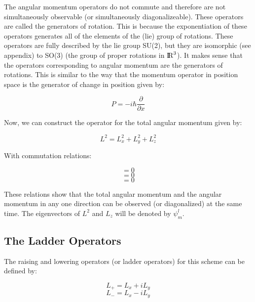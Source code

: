 \documentclass{article}
\begin{document}
The angular momentum operators do not commute and therefore are not simultaneously observable (or simultaneously diagonalizeable). These operators are called the generators of rotation. This is because the exponentiation of these operators generates all of the elements of the (lie) group of rotations. These operators are fully described by the lie group SU(2), but they are isomorphic (see appendix) to SO(3) (the group of proper rotations in ${\rm I\!R}^3$). It makes sense that the operators corresponding to angular momentum are the generators of rotations. This is similar to the way that the momentum operator in position space is the generator of change in position given by:

\begin{equation}
P = -i\hbar\frac{\partial}{\partial x} 
\end{equation}

Now, we can construct the operator for the total angular momentum given by:

\begin{equation}
L^2 = L_{x}^2 + L_{y}^2 + L_{z}^2
\end{equation}

With commutation relations:

\begin{equation}
[L^2, L_x] = 0
\end{equation}
\begin{equation}
[L^2, L_y] = 0
\end{equation}
\begin{equation}
[L^2, L_z] = 0
\end{equation}

These relations show that the total angular momentum and the angular momentum in any one direction can be observed (or diagonalized) at the same time. The eigenvectors of $L^2$ and $L_z$ will be denoted by $\psi_{m}^{l}$.

\subsection{The Ladder Operators}
The raising and lowering operators (or ladder operators) for this scheme can be defined by:

\begin{equation}
L_+ = L_x + iL_y
\end{equation}
\begin{equation}
L_- = L_x - iL_y
\end{equation}
\end{document}
